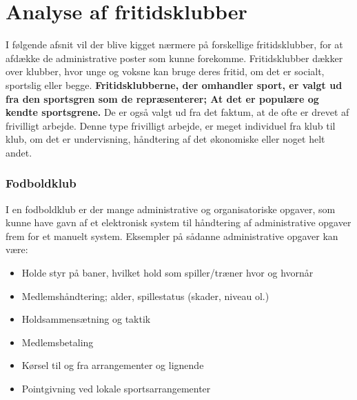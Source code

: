\chapter{Analyse af fritidsklubber} \label{Fritidsklubber} 

I følgende afsnit vil der blive kigget nærmere på forskellige fritidsklubber, for at afdække de administrative poster som kunne
forekomme. Fritidsklubber dækker over klubber, hvor unge og voksne kan bruge deres fritid, om det er
socialt, sportslig eller begge. 
\textbf{Fritidsklubberne, der omhandler sport, er valgt ud fra den sportsgren som de
repræsenterer; At det er populære og kendte sportsgrene.}
De er også valgt ud fra det faktum, at de ofte er drevet af
frivilligt arbejde. Denne type frivilligt arbejde, er meget individuel fra klub til klub, om det er undervisning,
håndtering af det økonomiske eller noget helt andet. 

\subsection{Fodboldklub} \label{Fodbold}
I en fodboldklub er der mange administrative og organisatoriske opgaver, som kunne have gavn af et elektronisk system
til håndtering af administrative opgaver frem for et manuelt system. Eksempler på sådanne
administrative opgaver kan være:

\begin{itemize}
\item Holde styr på baner, hvilket hold som spiller/træner hvor og hvornår
\item Medlemshåndtering; alder, spillestatus (skader, niveau ol.)
\item Holdsammensætning og taktik 
\item Medlemsbetaling
\item Kørsel til og fra arrangementer og lignende
\item Pointgivning ved lokale sportsarrangementer
\end{itemize}

